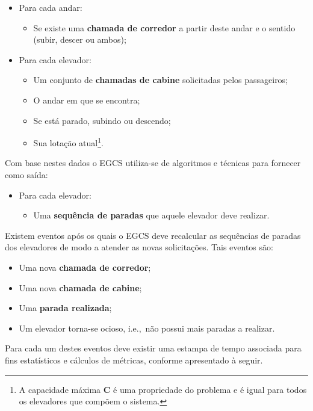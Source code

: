 \begin{itemize}
  \item Para cada andar:
  \begin{itemize}
    \item Se existe uma \textbf{chamada de corredor} a partir deste andar e o
          sentido (subir, descer ou ambos);
  \end{itemize}
  \item Para cada elevador:
  \begin{itemize}
    \item Um conjunto de \textbf{chamadas de cabine} solicitadas pelos
          passageiros;
    \item O andar em que se encontra;
    \item Se está parado, subindo ou descendo;
    \item Sua lotação atual\footnote{A capacidade máxima \textbf{C} é uma
          propriedade do problema e é igual para todos os elevadores que compõem
          o sistema.}.
  \end{itemize}
\end{itemize}

Com base nestes dados o EGCS utiliza-se de algoritmos e técnicas para fornecer como
saída:

\begin{itemize}
  \item Para cada elevador:
  \begin{itemize}
    \item Uma \textbf{sequência de paradas} que aquele elevador deve realizar.
  \end{itemize}
\end{itemize}

Existem eventos após os quais o EGCS deve recalcular as sequências de paradas
dos elevadores de modo a atender as novas solicitações. Tais eventos são:

\begin{itemize}
  \item Uma nova \textbf{chamada de corredor};
  \item Uma nova \textbf{chamada de cabine};
  \item Uma \textbf{parada realizada};
  \item Um elevador torna-se ocioso, i.e.,~não possui mais paradas a realizar.
\end{itemize}

Para cada um destes eventos deve existir uma estampa de tempo associada para
fins estatísticos e cálculos de métricas, conforme apresentado à seguir.


